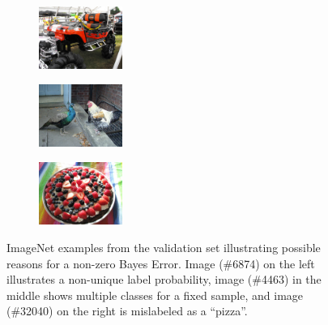 \documentclass[11pt]{article}
\begin{document}
\begin{figure}[t!]
\begin{subfigure}%
\centering%
\includegraphics[width=0.3\textwidth]{submissions/data-quality-ml-ops/figs/ILSVRC2012_val_00006874.JPEG}  
\end{subfigure}
\hfill
\begin{subfigure}%
\centering%
\includegraphics[width=0.3\textwidth]{submissions/data-quality-ml-ops/figs/ILSVRC2012_val_00004463.JPEG}  
\end{subfigure}
\hfill
\begin{subfigure}%
\centering%
\includegraphics[width=0.3\textwidth]{submissions/data-quality-ml-ops/figs/ILSVRC2012_val_00032040.JPEG}  
\end{subfigure}
\caption{ImageNet examples from the validation set illustrating possible reasons for a non-zero Bayes Error. Image (\#6874) on the left illustrates a non-unique label probability, image (\#4463) in the middle shows multiple classes for a fixed sample, and image (\#32040) on the right is mislabeled as a ``pizza''.}
\label{fig:imagenet_examples}
\end{figure}
\end{document}
